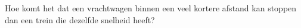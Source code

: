 
\begin{exercise}

 Hoe komt het dat een vrachtwagen binnen een veel kortere afstand kan stoppen dan een trein die dezelfde snelheid heeft?

\end{exercise}
